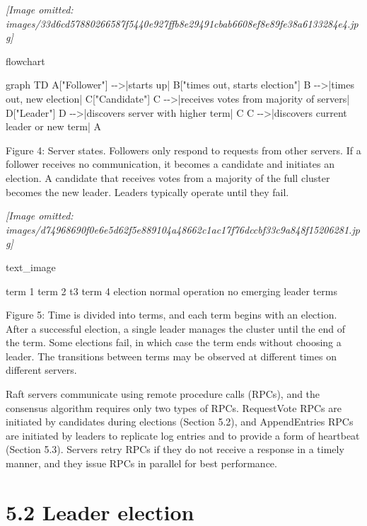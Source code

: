 \documentclass[
]{article}
\newenvironment{Shaded}{}{}
\newcommand{\NormalTok}[1]{#1}
\begin{document}
\textit{[Image omitted: images/33d6cd57880266587f5440e927ffb8e29491cbab6608ef8e89fe38a6133284e4.jpg]}

flowchart

\begin{Shaded}
\begin{Highlighting}[]
\NormalTok{graph TD}
\NormalTok{    A["Follower"] {-}{-}\textgreater{}|starts up| B["times out, starts election"]}
\NormalTok{    B {-}{-}\textgreater{}|times out, new election| C["Candidate"]}
\NormalTok{    C {-}{-}\textgreater{}|receives votes from majority of servers| D["Leader"]}
\NormalTok{    D {-}{-}\textgreater{}|discovers server with higher term| C}
\NormalTok{    C {-}{-}\textgreater{}|discovers current leader or new term| A}
\end{Highlighting}
\end{Shaded}

Figure 4: Server states. Followers only respond to requests from other
servers. If a follower receives no communication, it becomes a candidate
and initiates an election. A candidate that receives votes from a
majority of the full cluster becomes the new leader. Leaders typically
operate until they fail.

\textit{[Image omitted: images/d74968690f0e6e5d62f5e889104a48662c1ac17f76dccbf33c9a848f15206281.jpg]}

text\_image

term 1 term 2 t3 term 4 election normal operation no emerging leader
terms

Figure 5: Time is divided into terms, and each term begins with an
election. After a successful election, a single leader manages the
cluster until the end of the term. Some elections fail, in which case
the term ends without choosing a leader. The transitions between terms
may be observed at different times on different servers.

Raft servers communicate using remote procedure calls (RPCs), and the
consensus algorithm requires only two types of RPCs. RequestVote RPCs
are initiated by candidates during elections (Section 5.2), and
AppendEntries RPCs are initiated by leaders to replicate log entries and
to provide a form of heartbeat (Section 5.3). Servers retry RPCs if they
do not receive a response in a timely manner, and they issue RPCs in
parallel for best performance.

\section{5.2 Leader election}\label{leader-election}
\end{document}
